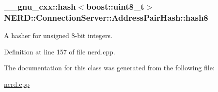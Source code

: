 \hypertarget{classNERD_1_1ConnectionServer_1_1AddressPairHash_aa5cd9f0aee285e5abf215216e031391a}{
\subsubsection[{hash8}]{\setlength{\rightskip}{0pt plus 5cm}\-\_\-\-\_\-gnu\-\_\-cxx\-::hash$<$boost\-::uint8\-\_\-t$>$ {\bf \-N\-E\-R\-D\-::\-Connection\-Server\-::\-Address\-Pair\-Hash\-::hash8}}}
\label{classNERD_1_1ConnectionServer_1_1AddressPairHash_aa5cd9f0aee285e5abf215216e031391a}


\-A hasher for unsigned 8-\/bit integers. 



\-Definition at line 157 of file nerd.\-cpp.



\-The documentation for this class was generated from the following file\-:\begin{DoxyCompactItemize}
\item 
\hyperlink{nerd_8cpp}{nerd.\-cpp}\end{DoxyCompactItemize}
